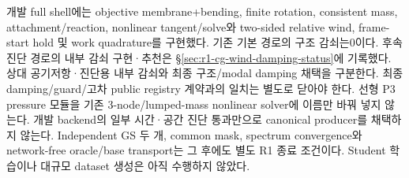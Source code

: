\documentclass[10pt]{article}
\begin{document}
개발 full shell에는 objective membrane+bending, finite rotation, consistent mass,
attachment/reaction, nonlinear tangent/solve와 two-sided relative wind,
frame-start hold 및 work quadrature를 구현했다. 기존 기본 경로의 구조 감쇠는0이다.
후속 진단 경로의 내부 감쇠 구현·추천은 \S\ref{sec:r1-cg-wind-damping-status}에 기록했다.
상대 공기저항·진단용 내부 감쇠와 최종 구조/modal damping 채택을 구분한다.
최종 damping/guard/고차 public registry 계약과의 일치는 별도로 닫아야 한다.
선형 P3 pressure 모듈을 기존 3-node/lumped-mass nonlinear solver에 이름만 바꿔 넣지 않는다.
개발 backend의 일부 시간·공간 진단 통과만으로 canonical producer를 채택하지 않는다.
Independent GS 두 개, common mask, spectrum convergence와 network-free oracle/base transport는 그 후에도
별도 R1 종료 조건이다. Student 학습이나 대규모 dataset 생성은 아직 수행하지 않았다.
\end{document}
